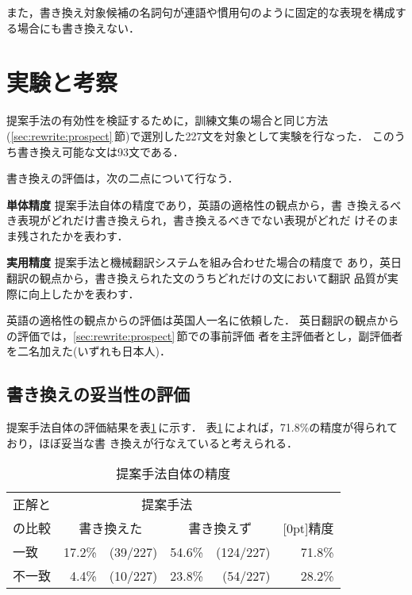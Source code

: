 また，書き換え対象候補の名詞句が連語や慣用句のように固定的な表現を構成す
る場合にも書き換えない．

\section{実験と考察}
\label{sec:experiment}

提案手法の有効性を検証するために，訓練文集の場合と同じ方法
(\ref{sec:rewrite:prospect}\,節)で選別した227文を対象として実験を行なった．
このうち書き換え可能な文は93文である．

書き換えの評価は，次の二点について行なう．
\begin{LIST}
\item[\bf 単体精度] 提案手法自体の精度であり，英語の適格性の観点から，書
き換えるべき表現がどれだけ書き換えられ，書き換えるべきでない表現がどれだ
けそのまま残されたかを表わす．
\item[\bf 実用精度] 提案手法と機械翻訳システムを組み合わせた場合の精度で
あり，英日翻訳の観点から，書き換えられた文のうちどれだけの文において翻訳
品質が実際に向上したかを表わす．
\end{LIST}
英語の適格性の観点からの評価は英国人一名に依頼した．
英日翻訳の観点からの評価では，\ref{sec:rewrite:prospect}\,節での事前評価
者を主評価者とし，副評価者を二名加えた(いずれも日本人)．

\subsection{書き換えの妥当性の評価}
\label{sec:experiment:preedit}

提案手法自体の評価結果を表\ref{tab:preedit}\,に示す．
表\ref{tab:preedit}\,によれば，71.8\%の精度が得られており，ほぼ妥当な書
き換えが行なえていると考えられる．
\begin{table}[htbp]
\caption{提案手法自体の精度}
\label{tab:preedit}
\begin{center}
\begin{tabular}{|l||r@{}r|r@{}r|r|}\hline
正解と&\multicolumn{4}{|c|}{提案手法}&\\\cline{2-5}
の比較&\multicolumn{2}{|c|}{書き換えた}&\multicolumn{2}{|c|}{書き換えず}
&\multicolumn{1}{|c|}{\raisebox{1.5ex}[0pt]{精度}}\\\hline\hline
一致   & 17.2\% & (39/227) & 54.6\% & (124/227) & 71.8\%\\\hline
不一致 &  4.4\% & (10/227) & 23.8\% & (54/227)  & 28.2\%\\\hline
\end{tabular}
\end{center}
\end{table}

